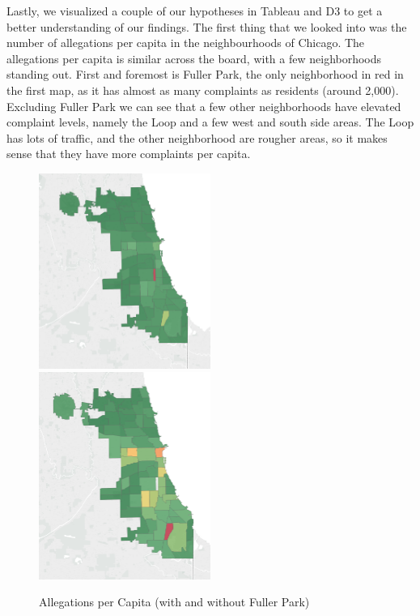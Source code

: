 \documentclass[11pt]{article}
\begin{document}
Lastly, we visualized a couple of our hypotheses in Tableau and D3 to get a better understanding of our findings. The first thing that we looked into was the number of allegations per capita in the neighbourhoods of Chicago. The allegations per capita is similar across the board, with a few neighborhoods standing out. First and foremost is Fuller Park, the only neighborhood in red in the first map, as it has almost as many complaints as residents (around 2,000). Excluding Fuller Park we can see that a few other neighborhoods have elevated complaint levels, namely the Loop and a few west and south side areas. The Loop has lots of traffic, and the other neighborhood are rougher areas, so it makes sense that they have more complaints per capita.

\begin{figure}[h]
\caption{Allegations per Capita (with and without Fuller Park)}
\includegraphics[width=0.5\textwidth]{plot1.png}
\includegraphics[width=0.5\textwidth]{plot2.png}
\end{figure}
\end{document}
